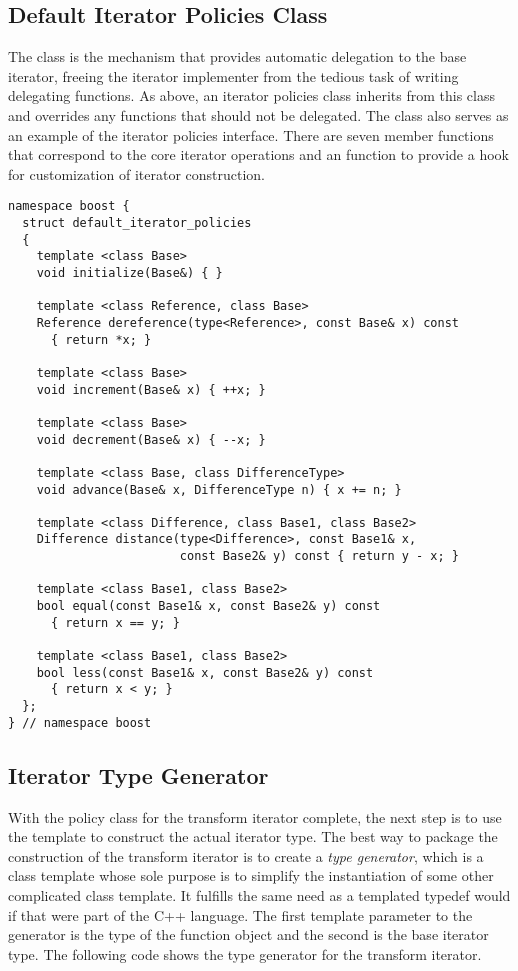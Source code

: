 \documentclass{netobjectdays}
\begin{document}
\subsection{Default Iterator Policies Class}

The  class is the mechanism that
provides automatic delegation to the base iterator, freeing the
iterator implementer from the tedious task of writing delegating
functions. As above, an iterator policies class inherits from this
class and overrides any functions that should not be delegated. The
 class also serves as an example
of the iterator policies interface. There are seven member functions
that correspond to the core iterator operations and an
 function to provide a hook for customization of
iterator construction.

{\footnotesize
\begin{verbatim}
namespace boost {
  struct default_iterator_policies
  {
    template <class Base>
    void initialize(Base&) { }

    template <class Reference, class Base>
    Reference dereference(type<Reference>, const Base& x) const
      { return *x; }

    template <class Base>
    void increment(Base& x) { ++x; }

    template <class Base>
    void decrement(Base& x) { --x; }

    template <class Base, class DifferenceType>
    void advance(Base& x, DifferenceType n) { x += n; }

    template <class Difference, class Base1, class Base2>
    Difference distance(type<Difference>, const Base1& x,
                        const Base2& y) const { return y - x; }

    template <class Base1, class Base2>
    bool equal(const Base1& x, const Base2& y) const
      { return x == y; }

    template <class Base1, class Base2>
    bool less(const Base1& x, const Base2& y) const
      { return x < y; }
  };
} // namespace boost
\end{verbatim}
}


\subsection{Iterator Type Generator}
\label{sec:iter-type-generator}

With the policy class for the transform iterator complete, the next
step is to use the  template to construct the
actual iterator type. The best way to package the construction of the
transform iterator is to create a \emph{type generator}, which is a
class template whose sole purpose is to simplify the instantiation of
some other complicated class template. It fulfills the same need as a
templated typedef would if that were part of the {C++} language.  The
first template parameter to the generator is the type of the function
object and the second is the base iterator type.  The following code
shows the type generator for the transform iterator.
\end{document}
